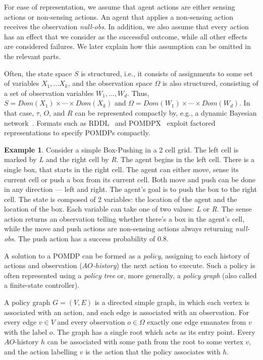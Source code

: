\documentclass[letterpaper]{article} %
\theoremstyle{definition}
\newtheorem{example}{Example}
\begin{document}
For ease of representation, we assume that agent actions are either sensing actions or non-sensing actions. An agent that applies a non-sensing action receives the observation {\em null-obs}. In addition, we also assume that every action has 
an effect that we consider as the successful outcome, while all other effects are considered failures. We later explain how this assumption can be omitted in the relevant parts.

Often, the state space $S$ is structured, i.e., it consists of assignments to some set of variables $X_1,\ldots X_k$, and the observation space $\Omega$ is
also structured, consisting of a set of observation variables $W_1,\ldots, W_d$. 
Thus, $S=Dom(X_1)\times\cdots\times Dom(X_k)$ and
$\Omega = Dom(W_1)\times\cdots\times Dom(W_d)$. 
In that case, $\tau$, $O$, and $R$ can be represented compactly by, e.g., a dynamic Bayesian network~\cite{BAYESNETWORK}. Formats such as RDDL~\cite{RDDL} and POMDPX~\cite{POMDPX}
exploit factored representations to specify POMDPs compactly.

\begin{example}
Consider a simple Box-Pushing in a 2 cell grid. The left cell is marked by \emph{L} and the right cell by \emph{R}. The agent begins in the left cell. There is a single box, that starts in the right cell. The agent can either move, sense its current cell or push a box from its current cell. Both move and push can be done in any direction --- left and right. The agent's goal is to push the box to the right cell.
The state is composed of 2 variables: the location of the agent and the location of the box. Each variable can take one of two values: \emph{L} or \emph{R}.
The sense action returns an observation telling whether there's a box in the agent's cell, while the move and push actions are non-sensing actions always returning {\em null-obs}.
The push action has a success probability of 0.8.
\end{example}

A solution to a POMDP can be formed as a {\em policy}, assigning to each history of actions and observation ({\em $AO$-history}) the next action to execute. 
Such a policy is often represented using a {\em policy tree} or, more generally, a {\em policy graph} (also called a finite-state controller). 

A policy graph $G=(V,E)$ is a directed simple graph, in which each vertex is associated with an action, and each edge is associated with an observation.
For every edge $v\in V$ and every observation $o\in\Omega$ exactly one edge emanates from $v$ with the label $o$.
The graph has a single root which acts as its entry point. Every $AO$-history $h$ can be associated with some path from the root to some vertex $v$,
and the action labelling $v$ is the action that the policy associates with $h$.
\end{document}
